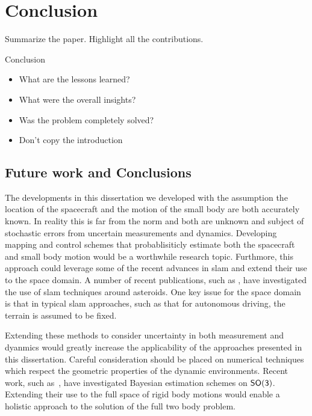 
\chapter{Conclusion}\label{sec:conclusion}
Summarize the paper. 
Highlight all the contributions.

Conclusion
\begin{itemize}
    \item What are the lessons learned?
    \item What were the overall insights?
    \item Was the problem completely solved? 
    \item Don't copy the introduction
\end{itemize}

\section{Future work and Conclusions}

The developments in this dissertation we developed with the assumption the location of the spacecraft and the motion of the small body are both accurately known.
In reality this is far from the norm and both are unknown and subject of stochastic errors from uncertain measurements and dynamics. 
Developing mapping and control schemes that probablisiticly estimate both the spacecraft and small body motion would be a worthwhile research topic.
Furthmore, this approach could leverage some of the recent advances in \gls{slam} and extend their use to the space domain.
A number of recent publications, such as \textcite{cocaud2010,cocaud2012,vassallo2015}, have investigated the use of \gls{slam} techniques around asteroids.
One key issue for the space domain is that in typical \gls{slam} approaches, such as that for autonomous driving, the terrain is assumed to be fixed.

Extending these methods to consider uncertainty in both measurement and dyanmics would greatly increase the applicability of the approaches presented in this dissertation.
Careful consideration should be placed on numerical techniques which respect the geometric properties of the dynamic environments.
Recent work, such as~\textcite{kulumani2017}, have investigated Bayesian estimation schemes on \( \mathsf{SO(3)} \). 
Extending their use to the full space of rigid body motions would enable a holistic approach to the solution of the full two body problem.



